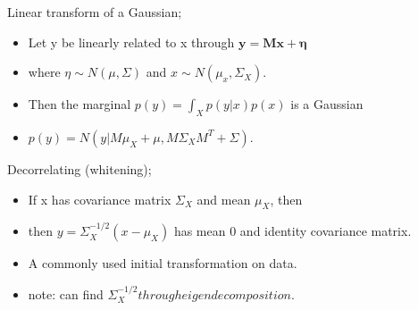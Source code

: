 \documentclass{article}
\begin{document}
Linear transform of a Gaussian; \begin{itemize}
    \item Let y be linearly related to x through $\mathbf{y = Mx + \eta}$
    \item where $\eta \sim N(\mu, \Sigma)$ and $x\sim N(\mu_x, \Sigma_X)$.
    \item Then the marginal $p(y)=\int_X p(y|x)p(x)$ is a Gaussian
    \item $p(y) = N(y|M\mu_X + \mu, M\Sigma_XM^T+\Sigma)$.
\end{itemize}

Decorrelating (whitening); \begin{itemize}
    \item If x has covariance matrix $\Sigma_X$ and mean $\mu_X$, then 
    \item then $y=\Sigma_X^{-1/2}(x-\mu_X)$ has mean 0 and identity covariance matrix.
    \item A commonly used initial transformation on data.
    \item note: can find $\Sigma_X^{-1/2} through eigendecomposition.$
\end{itemize}
\end{document}
